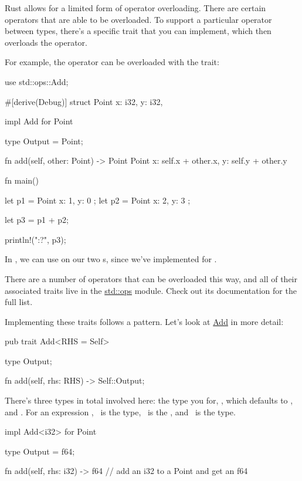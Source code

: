 Rust allows for a limited form of operator overloading. There are certain operators that are able to be overloaded. To support a particular 
operator between types, there's a specific trait that you can implement, which then overloads the operator.

\blank

For example, the \code{+} operator can be overloaded with the  trait:

\begin{rustc}
use std::ops::Add;

#[derive(Debug)]
struct Point {
    x: i32,
    y: i32,
}

impl Add for Point {
    type Output = Point;

    fn add(self, other: Point) -> Point {
        Point { x: self.x + other.x, y: self.y + other.y }
    }
}

fn main() {
    let p1 = Point { x: 1, y: 0 };
    let p2 = Point { x: 2, y: 3 };

    let p3 = p1 + p2;

    println!("{:?}", p3);
}
\end{rustc}

In , we can use \code{+} on our two s, since we've implemented  for .

\blank

There are a number of operators that can be overloaded this way, and all of their associated traits live in the 
\href{https://doc.rust-lang.org/std/ops/}{std::ops} module. Check out its documentation for the full list.

\blank

Implementing these traits follows a pattern. Let's look at \href{https://doc.rust-lang.org/std/ops/trait.Add.html}{Add} in more detail:

\begin{rustc}
pub trait Add<RHS = Self> {
    type Output;

    fn add(self, rhs: RHS) -> Self::Output;
}
\end{rustc}

There's three types in total involved here: the type you  for, , which defaults to , and . 
For an expression , \x\ is the  type, \y\ is the , and \z\ is the  type.

\begin{rustc}
impl Add<i32> for Point {
    type Output = f64;

    fn add(self, rhs: i32) -> f64 {
        // add an i32 to a Point and get an f64
    }
}
\end{rustc}

